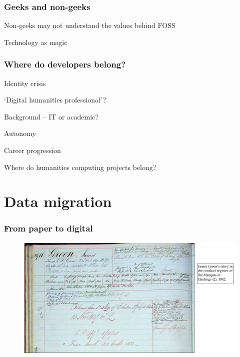 \documentclass[ignorenonframetext,11pt]{beamer}
\begin{document}
\begin{frame}
\frametitle{Geeks and non-geeks}
\label{geeksandnon-geeks}

Non-geeks may not understand the values behind FOSS


Technology as magic



\end{frame}
		

\begin{frame}
\frametitle{Where do developers belong?}
\label{wheredodevelopersbelong}

Identity crisis


`Digital humanities professional'?


Background -- IT or academic?


Autonomy


Career progression


Where do humanities computing projects belong?



\end{frame}
		

\section{Data migration}
\label{datamigration}

\begin{frame}
\frametitle{From paper to digital}
\label{frompapertodigital}

\begin{figure}
	\label{marquisofhastingsconductrecord}
	\begin{center}
	\includegraphics[keepaspectratio,width=\textwidth, height=.75\textheight]{images/conduct.png}
	\end{center}
	\end{figure}
	



\end{frame}
		
\end{document}
